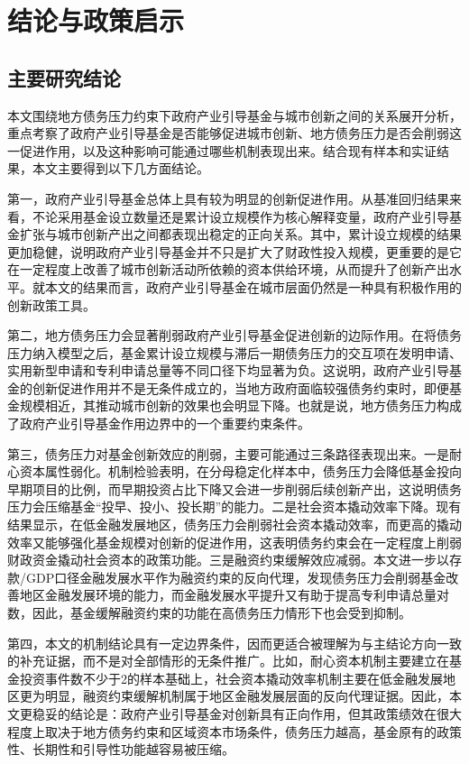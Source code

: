 
\section{结论与政策启示}

\subsection{主要研究结论}

本文围绕地方债务压力约束下政府产业引导基金与城市创新之间的关系展开分析，重点考察了政府产业引导基金是否能够促进城市创新、地方债务压力是否会削弱这一促进作用，以及这种影响可能通过哪些机制表现出来。结合现有样本和实证结果，本文主要得到以下几方面结论。

第一，政府产业引导基金总体上具有较为明显的创新促进作用。从基准回归结果来看，不论采用基金设立数量还是累计设立规模作为核心解释变量，政府产业引导基金扩张与城市创新产出之间都表现出稳定的正向关系。其中，累计设立规模的结果更加稳健，说明政府产业引导基金并不只是扩大了财政性投入规模，更重要的是它在一定程度上改善了城市创新活动所依赖的资本供给环境，从而提升了创新产出水平。就本文的结果而言，政府产业引导基金在城市层面仍然是一种具有积极作用的创新政策工具。

第二，地方债务压力会显著削弱政府产业引导基金促进创新的边际作用。在将债务压力纳入模型之后，基金累计设立规模与滞后一期债务压力的交互项在发明申请、实用新型申请和专利申请总量等不同口径下均显著为负。这说明，政府产业引导基金的创新促进作用并不是无条件成立的，当地方政府面临较强债务约束时，即便基金规模相近，其推动城市创新的效果也会明显下降。也就是说，地方债务压力构成了政府产业引导基金作用边界中的一个重要约束条件。

第三，债务压力对基金创新效应的削弱，主要可能通过三条路径表现出来。一是耐心资本属性弱化。机制检验表明，在分母稳定化样本中，债务压力会降低基金投向早期项目的比例，而早期投资占比下降又会进一步削弱后续创新产出，这说明债务压力会压缩基金“投早、投小、投长期”的能力。二是社会资本撬动效率下降。现有结果显示，在低金融发展地区，债务压力会削弱社会资本撬动效率，而更高的撬动效率又能够强化基金规模对创新的促进作用，这表明债务约束会在一定程度上削弱财政资金撬动社会资本的政策功能。三是融资约束缓解效应减弱。本文进一步以存款/GDP口径金融发展水平作为融资约束的反向代理，发现债务压力会削弱基金改善地区金融发展环境的能力，而金融发展水平提升又有助于提高专利申请总量对数，因此，基金缓解融资约束的功能在高债务压力情形下也会受到抑制。

第四，本文的机制结论具有一定边界条件，因而更适合被理解为与主结论方向一致的补充证据，而不是对全部情形的无条件推广。比如，耐心资本机制主要建立在基金投资事件数不少于2的样本基础上，社会资本撬动效率机制主要在低金融发展地区更为明显，融资约束缓解机制属于地区金融发展层面的反向代理证据。因此，本文更稳妥的结论是：政府产业引导基金对创新具有正向作用，但其政策绩效在很大程度上取决于地方债务约束和区域资本市场条件，债务压力越高，基金原有的政策性、长期性和引导性功能越容易被压缩。

